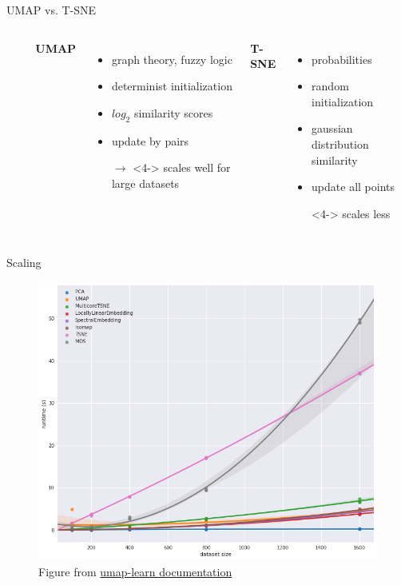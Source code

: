 \documentclass{irdbeamer}
\begin{document}
\begin{frame}{UMAP vs. T-SNE}
\begin{columns}
\begin{column}{0.05\textwidth}
\begin{itemize}
    \item[] 
    \item[] 
    \item[] 
    \item[] 
    \item[] 
\end{itemize}
\end{column}
        \textbf{UMAP}
        \begin{itemize}
            \item<1-> graph theory, fuzzy logic
            \item<2-> determinist initialization
            \item<3-> $log_2$ similarity scores
            \item<4-> update by pairs 
            \item[$\rightarrow$]<4-> scales well for large datasets
        \end{itemize}
        \textbf{T-SNE}
        \begin{itemize}
            \item<1-> probabilities
            \item<2-> random initialization
            \item<3-> gaussian distribution similarity
            \item<4-> update all points
            \item[]<4-> scales less
        \end{itemize}
\end{columns}
\end{frame}

\begin{frame}{Scaling}
    \vspace{-.5cm}
    \begin{figure}
    \centering
    \includegraphics[width=.5\textwidth]{./figs/performance_umap.png}
    \caption{\tiny Figure from \href{https://umap-learn.readthedocs.io/en/latest/benchmarking.html}{umap-learn documentation}}
    \end{figure}
\end{frame}
\end{document}
